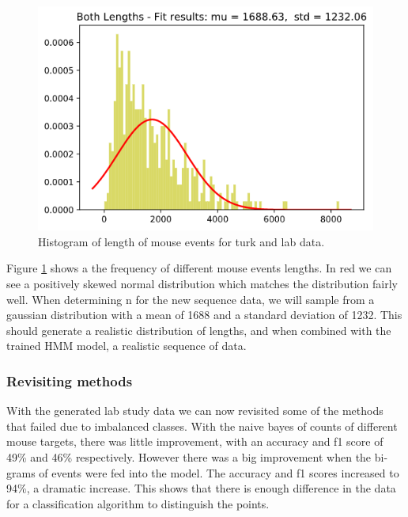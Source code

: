 \documentclass{article}
\begin{document}
\begin{figure}[ht]
    \centering
    \includegraphics[scale=0.5]{Images/Lengths-Histogram.png}
    \caption{Histogram of length of mouse events for turk and lab data.}
    \label{fig:normaldis}
\end{figure}

Figure \ref{fig:normaldis} shows a the frequency of different mouse events lengths.
In red we can see a positively skewed normal distribution which matches the distribution fairly well.
When determining n for the new sequence data, we will sample from a gaussian distribution with a mean of 1688 and a standard deviation of 1232.
This should generate a realistic distribution of lengths, and when combined with the trained HMM model, a realistic sequence of data.



\subsubsection{Revisiting methods}

With the generated lab study data we can now revisited some of the methods that failed due to imbalanced classes.
With the naive bayes of counts of different mouse targets, there was little improvement, with an accuracy and f1 score of 49\% and 46\% respectively.
However there was a big improvement when the bi-grams of events were fed into the model.
The accuracy and f1 scores increased to 94\%, a dramatic increase.
This shows that there is enough difference in the data for a classification algorithm to distinguish the points. 
\end{document}
